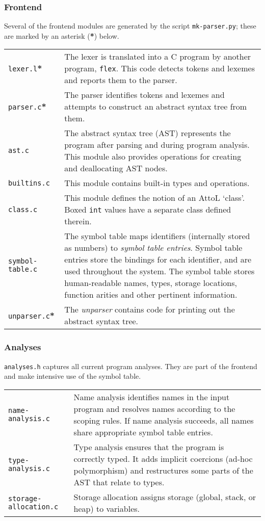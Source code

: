 \documentclass[11pt,a4paper]{article}
\begin{document}
\subsubsection{Frontend}

Several of the frontend modules are generated by the script \texttt{mk-parser.py}; these are marked by an asterisk (\textbf{*}) below.

\begin{tabular}{p{4cm}p{12cm}}
\texttt{lexer.l}\textbf{*} & The lexer is translated into a C program by another program, \texttt{flex}.
This code detects tokens and lexemes and reports them to the parser. \\
\texttt{parser.c}\textbf{*} & The parser identifies tokens and lexemes and attempts to construct an
abstract syntax tree from them. \\
\texttt{ast.c} & The abstract syntax tree (AST) represents the program after parsing and during program analysis.
This module also provides operations for creating and deallocating AST nodes.\\
\texttt{builtins.c} & This module contains built-in types and operations. \\
\texttt{class.c} & This module defines the notion of an AttoL `class'.
Boxed \texttt{int} values have a separate class defined therein. \\
\texttt{symbol-table.c} & The symbol table maps identifiers (internally stored as numbers) to \emph{symbol table entries}.
Symbol table entries store the bindings for each identifier, and are used throughout the system.  The
symbol table stores human-readable names, types, storage locations, function arities and other pertinent information.\\
\texttt{unparser.c}\textbf{*} & The \emph{unparser} contains code for printing out the abstract syntax tree.\\
\end{tabular}

\subsubsection{Analyses}

\texttt{analyses.h} captures all current program analyses.
They are part of the frontend and make intensive use of the symbol table.

\begin{tabular}{p{4cm}p{12cm}}
\texttt{name-analysis.c} & Name analysis identifies names in the input program and resolves names according to the scoping rules.  If name analysis succeeds, all names share appropriate symbol table entries.\\
\texttt{type-analysis.c} & Type analysis ensures that the program is correctly typed.  It adds implicit coercions (ad-hoc polymorphism) and
restructures some parts of the AST that relate to types. \\
\texttt{storage-allocation.c} & Storage allocation assigns storage (global, stack, or heap) to variables. \\
\end{tabular}
\end{document}

